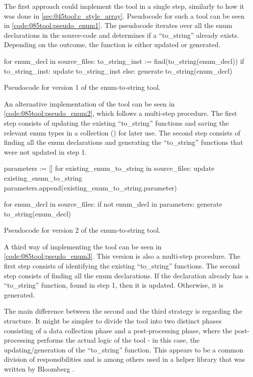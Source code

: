 The first approach could implement the tool in a single step, similarly to how it was done in \cref{sec:045tool:c_style_array}. Pseudocode for such a tool can be seen in \cref{code:085tool:pseudo_enum1}. The pseudocode iterates over all the enum declarations in the source-code and determines if a ``to\_string'' already exists. Depending on the outcome, the function is either updated or generated.

\begin{listing}[H]
    \begin{pythoncode}
for enum_decl in source_files:
    to_string_inst := find(to_string(enum_decl))
    if to_string_inst:
        update to_string_inst
    else:
        generate to_string(enum_decl)
    \end{pythoncode}
    \caption{Pseudocode for version 1 of the enum-to-string tool.}
    \label{code:085tool:pseudo_enum1}
\end{listing}

An alternative implementation of the tool can be seen in \cref{code:085tool:pseudo_enum2}, which follows a multi-step procedure. The first step consists of updating the existing ``to\_string'' functions and saving the relevant enum types in a collection () for later use. The second step consists of finding all the enum declarations and generating the ``to\_string'' functions that were not updated in step 1.

\begin{listing}[H]
    \begin{pythoncode}
parameters := []
for existing_enum_to_string in source_files:
    update existing_enum_to_string
    parameters.append(existing_enum_to_string.parameter)

for enum_decl in source_files:
    if not enum_decl in parameters:
        generate to_string(enum_decl)
    \end{pythoncode}
    \caption{Pseudocode for version 2 of the enum-to-string tool.}
    \label{code:085tool:pseudo_enum2}
\end{listing}

A third way of implementing the tool can be seen in \cref{code:085tool:pseudo_enum3}. This version is also a multi-step procedure. The first step consists of identifying the existing ``to\_string'' functions. The second step consists of finding all the enum declarations. If the declaration already has a ``to\_string'' function, found in step 1, then it is updated. Otherwise, it is generated.

The main difference between the second and the third strategy is regarding the structure. It might be simpler to divide the tool into two distinct phases consisting of a data collection phase and a post-processing phase, where the post-processing performs the actual logic of the tool - in this case, the updating/generation of the ``to\_string'' function. This appears to be a common division of responsibilities and is among others used in a helper library that was written by Bloomberg \cite{bloombergClangmetatoolFrameworkReusing2023}.

